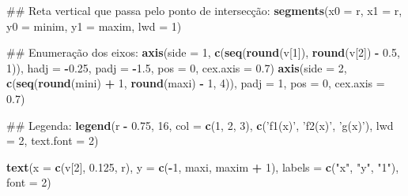 \documentclass[]{book}
\newenvironment{Shaded}{\begin{snugshade}}{\end{snugshade}}
\newcommand{\KeywordTok}[1]{\textcolor[rgb]{0.13,0.29,0.53}{\textbf{#1}}}
\newcommand{\DataTypeTok}[1]{\textcolor[rgb]{0.13,0.29,0.53}{#1}}
\newcommand{\DecValTok}[1]{\textcolor[rgb]{0.00,0.00,0.81}{#1}}
\newcommand{\FloatTok}[1]{\textcolor[rgb]{0.00,0.00,0.81}{#1}}
\newcommand{\StringTok}[1]{\textcolor[rgb]{0.31,0.60,0.02}{#1}}
\newcommand{\OperatorTok}[1]{\textcolor[rgb]{0.81,0.36,0.00}{\textbf{#1}}}
\newcommand{\NormalTok}[1]{#1}
\begin{document}
\begin{enumerate}
\begin{Shaded}
\begin{Highlighting}[]
\NormalTok{##  Reta vertical que passa pelo ponto de intersecção:}
\KeywordTok{segments}\NormalTok{(}\DataTypeTok{x0 =}\NormalTok{ r, }\DataTypeTok{x1 =}\NormalTok{ r,}
     \DataTypeTok{y0 =}\NormalTok{ minim, }\DataTypeTok{y1 =}\NormalTok{ maxim, }\DataTypeTok{lwd =} \DecValTok{1}\NormalTok{)}

\NormalTok{##  Enumeração dos eixos:}
\KeywordTok{axis}\NormalTok{(}\DataTypeTok{side =} \DecValTok{1}\NormalTok{, }\KeywordTok{c}\NormalTok{(}\KeywordTok{seq}\NormalTok{(}\KeywordTok{round}\NormalTok{(v[}\DecValTok{1}\NormalTok{]), }\KeywordTok{round}\NormalTok{(v[}\DecValTok{2}\NormalTok{]) }\OperatorTok{-}\StringTok{ }\FloatTok{0.5}\NormalTok{, }\DecValTok{1}\NormalTok{)),}
 \DataTypeTok{hadj =} \OperatorTok{-}\FloatTok{0.25}\NormalTok{, }\DataTypeTok{padj =} \OperatorTok{-}\FloatTok{1.5}\NormalTok{, }\DataTypeTok{pos =} \DecValTok{0}\NormalTok{, }\DataTypeTok{cex.axis =} \FloatTok{0.7}\NormalTok{)}
\KeywordTok{axis}\NormalTok{(}\DataTypeTok{side =} \DecValTok{2}\NormalTok{, }\KeywordTok{c}\NormalTok{(}\KeywordTok{seq}\NormalTok{(}\KeywordTok{round}\NormalTok{(mini) }\OperatorTok{+}\StringTok{ }\DecValTok{1}\NormalTok{, }\KeywordTok{round}\NormalTok{(maxi) }\OperatorTok{-}\StringTok{ }\DecValTok{1}\NormalTok{, }\DecValTok{4}\NormalTok{)),}
 \DataTypeTok{padj =} \DecValTok{1}\NormalTok{, }\DataTypeTok{pos =} \DecValTok{0}\NormalTok{, }\DataTypeTok{cex.axis =} \FloatTok{0.7}\NormalTok{)}

\NormalTok{##  Legenda:}
\KeywordTok{legend}\NormalTok{(r }\OperatorTok{-}\StringTok{ }\FloatTok{0.75}\NormalTok{, }\DecValTok{16}\NormalTok{, }\DataTypeTok{col =} \KeywordTok{c}\NormalTok{(}\DecValTok{1}\NormalTok{, }\DecValTok{2}\NormalTok{, }\DecValTok{3}\NormalTok{), }\KeywordTok{c}\NormalTok{(}\StringTok{'f1(x)'}\NormalTok{, }\StringTok{'f2(x)'}\NormalTok{, }\StringTok{'g(x)'}\NormalTok{),}
   \DataTypeTok{lwd =} \DecValTok{2}\NormalTok{, }\DataTypeTok{text.font =} \DecValTok{2}\NormalTok{)}

\KeywordTok{text}\NormalTok{(}\DataTypeTok{x =} \KeywordTok{c}\NormalTok{(v[}\DecValTok{2}\NormalTok{], }\FloatTok{0.125}\NormalTok{, r), }\DataTypeTok{y =} \KeywordTok{c}\NormalTok{(}\OperatorTok{-}\DecValTok{1}\NormalTok{, maxi, maxim }\OperatorTok{+}\StringTok{ }\DecValTok{1}\NormalTok{),}
 \DataTypeTok{labels =} \KeywordTok{c}\NormalTok{(}\StringTok{"x"}\NormalTok{, }\StringTok{"y"}\NormalTok{, }\StringTok{"1"}\NormalTok{), }\DataTypeTok{font =} \DecValTok{2}\NormalTok{)}
\end{Highlighting}
\end{Shaded}


\end{enumerate}
\end{document}
